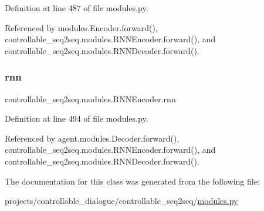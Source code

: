 Definition at line 487 of file modules.\+py.



Referenced by modules.\+Encoder.\+forward(), controllable\+\_\+seq2seq.\+modules.\+R\+N\+N\+Encoder.\+forward(), and controllable\+\_\+seq2seq.\+modules.\+R\+N\+N\+Decoder.\+forward().

\mbox{\label{classcontrollable__seq2seq_1_1modules_1_1RNNEncoder_a096201c636aa524910b39167d3c29380}} 
\subsubsection{\texorpdfstring{rnn}{rnn}}
{\footnotesize\ttfamily controllable\+\_\+seq2seq.\+modules.\+R\+N\+N\+Encoder.\+rnn}



Definition at line 494 of file modules.\+py.



Referenced by agent.\+modules.\+Decoder.\+forward(), controllable\+\_\+seq2seq.\+modules.\+R\+N\+N\+Encoder.\+forward(), and controllable\+\_\+seq2seq.\+modules.\+R\+N\+N\+Decoder.\+forward().



The documentation for this class was generated from the following file\+:\begin{DoxyCompactItemize}
\item 
projects/controllable\+\_\+dialogue/controllable\+\_\+seq2seq/\hyperlink{projects_2controllable__dialogue_2controllable__seq2seq_2modules_8py}{modules.\+py}\end{DoxyCompactItemize}
